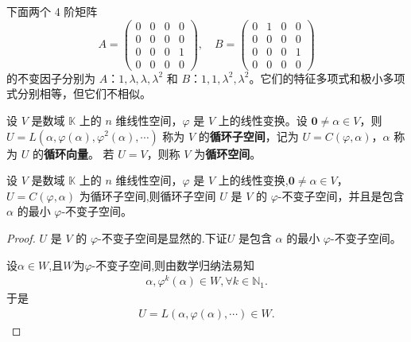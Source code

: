 \documentclass[../../main.tex]{subfiles}
\begin{document}
\begin{example}
下面两个 4 阶矩阵
\[
A = \begin{pmatrix}
0 & 0 & 0 & 0 \\
0 & 0 & 0 & 0 \\
0 & 0 & 0 & 1 \\
0 & 0 & 0 & 0
\end{pmatrix}, \quad
B = \begin{pmatrix}
0 & 1 & 0 & 0 \\
0 & 0 & 0 & 0 \\
0 & 0 & 0 & 1 \\
0 & 0 & 0 & 0
\end{pmatrix}
\]
的不变因子分别为 $A$：$1,\lambda,\lambda,\lambda^2$ 和 $B$：$1,1,\lambda^2,\lambda^2$。它们的特征多项式和极小多项式分别相等，但它们不相似。 
\end{example}

\begin{definition}[循环子空间]\label{definition:循环子空间和循环空间}
设 \(V\) 是数域 \(\mathbb{K}\) 上的 \(n\) 维线性空间，\(\varphi\) 是 \(V\) 上的线性变换。设 \(\mathbf{0}\neq\alpha\in V\)，则 \(U = L(\alpha,\varphi(\alpha),\varphi^2(\alpha),\cdots)\) 称为 \(V\) 的\textbf{循环子空间}，记为 \(U = C(\varphi,\alpha)\)，\(\alpha\) 称为 \(U\) 的\textbf{循环向量}。
若 \(U = V\)，则称 \(V\) 为\textbf{循环空间}。 
\end{definition}

\begin{theorem}[循环子空间的基本性质]\label{theorem:循环子空间的基本性质}
设 \(V\) 是数域 \(\mathbb{K}\) 上的 \(n\) 维线性空间，\(\varphi\) 是 \(V\) 上的线性变换,\(\mathbf{0}\neq\alpha\in V\)， \(U = C(\varphi,\alpha)\) 为循环子空间,则循环子空间 \(U\) 是 \(V\) 的 \(\varphi\)-不变子空间，并且是包含 \(\alpha\) 的最小 \(\varphi\)-不变子空间。
\end{theorem}
\begin{proof}
\(U\) 是 \(V\) 的 \(\varphi\)-不变子空间是显然的.下证\(U\) 是包含 \(\alpha\) 的最小 \(\varphi\)-不变子空间。

设$\alpha \in W$,且$W$为$\varphi$-不变子空间,则由数学归纳法易知
\begin{align*}
\alpha,\varphi^k(\alpha)\in W,\forall k\in \mathbb{N}_1.
\end{align*}
于是
\begin{align*}
U=L(\alpha,\varphi(\alpha),\cdots)\in W.
\end{align*}
\end{proof}
\end{document}
